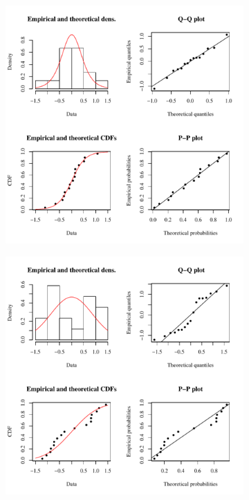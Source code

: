 \begin{linenumbers}
\subfiguretop
\begin{landscape}
	\begin{figure}
		\begin{subfigure}{0.7\textwidth}
			\centering
			\includegraphics[width=\tableCustomSize]{"Figures/Results_USR/Stochastic/Conc Model res-fit U163"}
		\end{subfigure}%
		\begin{subfigure}{0.7\textwidth}
			\centering
			\includegraphics[width=\tableCustomSize]{"Figures/Results_USR/Stochastic/Conc Model res-fit U201"}

\end{subfigure}
\end{figure}
\end{landscape}
\end{linenumbers}
